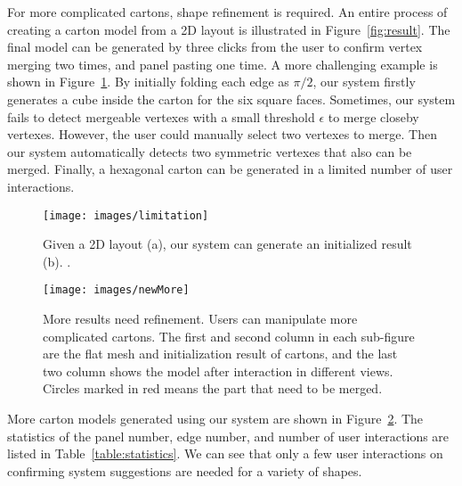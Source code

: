 For more complicated cartons, shape refinement is required. 
An entire process of creating a carton model from a 2D layout is illustrated in Figure~\ref{fig:result}.
%
The final model can be generated by three clicks from the user to confirm vertex merging two times, and panel pasting one time.
%
A more challenging example is shown in Figure~\ref{fig:hexagon}. 
By initially folding each edge as $\pi/2$, our system firstly generates a cube inside the carton for the six square faces. 
Sometimes, our system fails to detect mergeable vertexes with a small threshold $\epsilon$ to merge closeby vertexes.
%
However, the user could manually select two vertexes to merge. Then our system automatically detects two symmetric vertexes that also can be merged. 
%
Finally, a hexagonal carton can be generated in a limited number of user interactions.
%



%





\begin{figure}
	\centering
	\texttt{[image: images/limitation]}
	\caption{Given a 2D layout (a), our system can generate an initialized result (b). . }
	\label{fig:hexagon}
\end{figure}

\begin{figure}
	\centering
	\texttt{[image: images/newMore]}
	\caption{More results need refinement. Users can manipulate more complicated cartons. The first and second column in each sub-figure are the flat mesh and initialization result of cartons, and the last two column shows the model after interaction in  different views. Circles marked in red means the part that need to be merged.}
	\label{fig:result-more}
\end{figure}



More carton models generated using our system  are shown in Figure~\ref{fig:result-more}.
The statistics of the panel number, edge number, and number of user interactions are listed in Table~\ref{table:statistics}. 
We can see that only a few user interactions on confirming system suggestions are needed for a variety of shapes.


